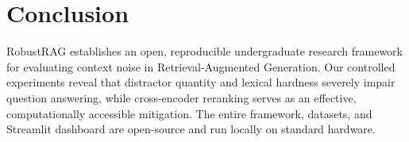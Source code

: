\documentclass[conference]{IEEEtran}
\begin{document}
\section{Conclusion}
RobustRAG establishes an open, reproducible undergraduate research framework for evaluating context noise in Retrieval-Augmented Generation. Our controlled experiments reveal that distractor quantity and lexical hardness severely impair question answering, while cross-encoder reranking serves as an effective, computationally accessible mitigation. The entire framework, datasets, and Streamlit dashboard are open-source and run locally on standard hardware.



\end{document}
